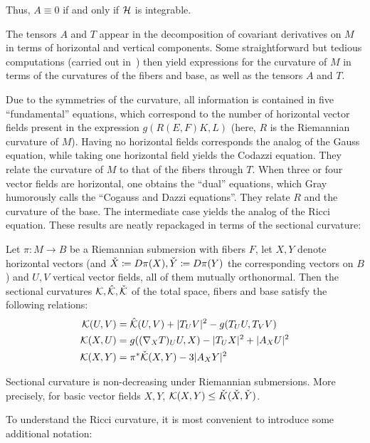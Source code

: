 Thus, $A\equiv 0$ if and only if $\mathcal{H}$ is integrable.

The tensors $A$ and $T$ appear in the decomposition of covariant derivatives on $M$ in terms of horizontal and vertical components. Some straightforward but tedious computations (carried out in~\cite{ON1966,Gra1967}) then yield expressions for the curvature of $M$ in terms of the curvatures of the fibers and base, as well as the tensors $A$ and $T$. 

Due to the symmetries of the curvature, all information is contained in five ``fundamental'' equations, which correspond to the number of horizontal vector fields present in the expression $g(R(E,F)K,L)$ (here, $R$ is the Riemannian curvature of $M$). Having no horizontal fields corresponds the analog of the Gauss equation, while taking one horizontal field yields the Codazzi equation. They relate the curvature of $M$ to that of the fibers through $T$. When three or four vector fields are horizontal, one obtains the ``dual'' equations, which Gray humorously calls the ``Cogauss and Dazzi equations''. They relate $R$ and the curvature of the base. The intermediate case yields the analog of the Ricci equation. These results are neatly repackaged in terms of the sectional curvature:

\begin{thm}\label{thm:submersioncurvature}
	Let $\pi:M\to B$ be a Riemannian submersion with fibers $F$, let $X,Y$ denote horizontal vectors (and $\check X\coloneqq D\pi(X),\check Y\coloneqq D\pi(Y)$ the corresponding vectors on $B$) and $U,V$ vertical vector fields, all of them mutually orthonormal. Then the sectional curvatures $\mathcal{K},\hat{\mathcal{K}},\check{\mathcal{K}}$ of the total space, fibers and base satisfy the following relations:
	\begin{align*}
		\mathcal{K}(U,V)&=\hat{\mathcal{K}}(U,V)+|T_U V|^2-g(T_U U,T_V V) \\
		\mathcal{K}(X,U)&=g((\nabla_X T)_U U,X)-|T_U X|^2+|A_X U|^2\\
		\mathcal{K}(X,Y)&=\pi^*\check{\mathcal{K}}(X,Y)-3|A_X Y|^2
	\end{align*}
\end{thm}

\begin{cor}
	Sectional curvature is non-decreasing under Riemannian submersions. More precisely, for basic vector fields $X,Y$, $\mathcal{K}(X,Y)\leq \check K(\check X,\check Y)$.\proofclear
\end{cor}

To understand the Ricci curvature, it is most convenient to introduce some additional notation:

